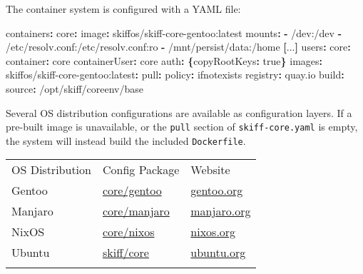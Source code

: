 \documentclass[english,]{IEEEtran}
\newenvironment{Shaded}{}{}
\newcommand{\AttributeTok}[1]{\textcolor[rgb]{0.49,0.56,0.16}{#1}}
\newcommand{\CharTok}[1]{\textcolor[rgb]{0.25,0.44,0.63}{#1}}
\newcommand{\FunctionTok}[1]{\textcolor[rgb]{0.02,0.16,0.49}{#1}}
\newcommand{\KeywordTok}[1]{\textcolor[rgb]{0.00,0.44,0.13}{\textbf{#1}}}
\let\endhead\relax
\begin{document}
The container system is configured with a YAML file:

\begin{Shaded}
\begin{Highlighting}[]
\FunctionTok{containers}\KeywordTok{:}
\AttributeTok{  }\FunctionTok{core}\KeywordTok{:}
\AttributeTok{    }\FunctionTok{image}\KeywordTok{:}\AttributeTok{ skiffos/skiff{-}core{-}gentoo:latest}
\AttributeTok{    }\FunctionTok{mounts}\KeywordTok{:}
\AttributeTok{      }\KeywordTok{{-}}\AttributeTok{ /dev:/dev}
\AttributeTok{      }\KeywordTok{{-}}\AttributeTok{ /etc/resolv.conf:/etc/resolv.conf:ro}
\AttributeTok{      }\KeywordTok{{-}}\AttributeTok{ /mnt/persist/data:/home}
\AttributeTok{    }\KeywordTok{[}\AttributeTok{...}\KeywordTok{]}
\FunctionTok{users}\KeywordTok{:}
\AttributeTok{  }\FunctionTok{core}\KeywordTok{:}
\AttributeTok{    }\FunctionTok{container}\KeywordTok{:}\AttributeTok{ core}
\AttributeTok{    }\FunctionTok{containerUser}\KeywordTok{:}\AttributeTok{ core}
\AttributeTok{    }\FunctionTok{auth}\KeywordTok{:}\AttributeTok{ }\KeywordTok{\{}\FunctionTok{copyRootKeys}\KeywordTok{:}\AttributeTok{ }\CharTok{true}\KeywordTok{\}}
\FunctionTok{images}\KeywordTok{:}
\AttributeTok{  skiffos/skiff{-}core{-}gentoo}\FunctionTok{:latest}\KeywordTok{:}
\AttributeTok{    }\FunctionTok{pull}\KeywordTok{:}
\AttributeTok{      }\FunctionTok{policy}\KeywordTok{:}\AttributeTok{ ifnotexists}
\AttributeTok{      }\FunctionTok{registry}\KeywordTok{:}\AttributeTok{ quay.io}
\AttributeTok{    }\FunctionTok{build}\KeywordTok{:}
\AttributeTok{      }\FunctionTok{source}\KeywordTok{:}\AttributeTok{ /opt/skiff/coreenv/base}
\end{Highlighting}
\end{Shaded}

Several OS distribution configurations are available as configuration
layers. If a pre-built image is unavailable, or the \texttt{pull}
section of \texttt{skiff-core.yaml} is empty, the system will instead
build the included \texttt{Dockerfile}.

\begin{longtable}[]{@{}lll@{}}
\toprule
OS Distribution & Config Package & Website \\ \addlinespace
\midrule
\endhead
Gentoo &
\href{https://github.com/skiffos/skiffos/tree/2020.11.7/configs/core/gentoo}{core/gentoo}
& \href{https://gentoo.org}{gentoo.org} \\ \addlinespace
Manjaro &
\href{https://github.com/skiffos/skiffos/tree/2020.11.7/configs/core/manjaro}{core/manjaro}
& \href{https://manjaro.org}{manjaro.org} \\ \addlinespace
NixOS &
\href{https://github.com/skiffos/skiffos/tree/2020.11.7/configs/core/nixos/}{core/nixos}
& \href{https://nixos.org}{nixos.org} \\ \addlinespace
Ubuntu &
\href{https://github.com/skiffos/skiffos/tree/2020.11.7/configs/skiff/core/}{skiff/core}
& \href{https://ubuntu.org}{ubuntu.org} \\ \addlinespace
\bottomrule
\end{longtable}
\end{document}

